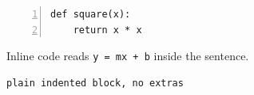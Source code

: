 \documentclass{article}
\begin{document}
\begin{Verbatim}[numbers=left,frame=single]
def square(x):
    return x * x
\end{Verbatim}
Inline code reads \Verb|y = mx + b| inside the sentence.
\begin{Verbatim}[fontsize=\small]
plain indented block, no extras
\end{Verbatim}
\end{document}
